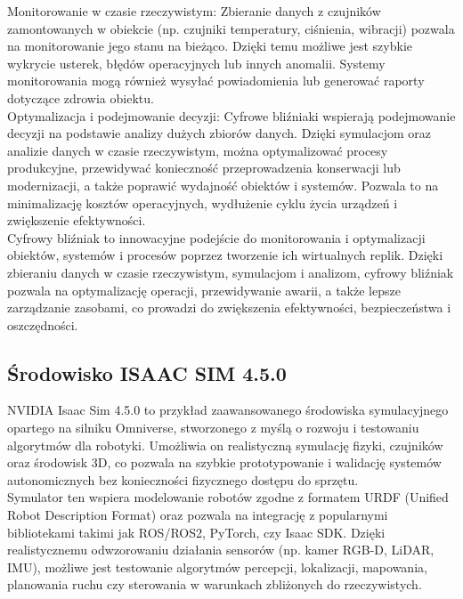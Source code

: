 \documentclass[12pt]{article}
\begin{document}
\noindent Monitorowanie w czasie rzeczywistym: Zbieranie danych z czujników zamontowanych w obiekcie (np. czujniki temperatury, ciśnienia, wibracji) pozwala na monitorowanie jego stanu na bieżąco. Dzięki temu możliwe jest szybkie wykrycie usterek, błędów operacyjnych lub innych anomalii. Systemy monitorowania mogą również wysyłać powiadomienia lub generować raporty dotyczące zdrowia obiektu.\\

\noindent Optymalizacja i podejmowanie decyzji: Cyfrowe bliźniaki wspierają podejmowanie decyzji na podstawie analizy dużych zbiorów danych. Dzięki symulacjom oraz analizie danych w czasie rzeczywistym, można optymalizować procesy produkcyjne, przewidywać konieczność przeprowadzenia konserwacji lub modernizacji, a także poprawić wydajność obiektów i systemów. Pozwala to na minimalizację kosztów operacyjnych, wydłużenie cyklu życia urządzeń i zwiększenie efektywności.\\

\noindent Cyfrowy bliźniak to innowacyjne podejście do monitorowania i optymalizacji obiektów, systemów i procesów poprzez tworzenie ich wirtualnych replik. Dzięki zbieraniu danych w czasie rzeczywistym, symulacjom i analizom, cyfrowy bliźniak pozwala na optymalizację operacji, przewidywanie awarii, a także lepsze zarządzanie zasobami, co prowadzi do zwiększenia efektywności, bezpieczeństwa i oszczędności.

\clearpage

\subsection{Środowisko ISAAC SIM 4.5.0}

NVIDIA Isaac Sim 4.5.0 to przykład zaawansowanego środowiska symulacyjnego opartego na silniku Omniverse, stworzonego z myślą o rozwoju i testowaniu algorytmów dla robotyki. Umożliwia on realistyczną symulację fizyki, czujników oraz środowisk 3D, co pozwala na szybkie prototypowanie i walidację systemów autonomicznych bez konieczności fizycznego dostępu do sprzętu.\\

\noindent Symulator ten wspiera modelowanie robotów zgodne z formatem URDF (Unified Robot Description Format) oraz pozwala na integrację z popularnymi bibliotekami takimi jak ROS/ROS2, PyTorch, czy Isaac SDK. Dzięki realistycznemu odwzorowaniu działania sensorów (np. kamer RGB-D, LiDAR, IMU), możliwe jest testowanie algorytmów percepcji, lokalizacji, mapowania, planowania ruchu czy sterowania w warunkach zbliżonych do rzeczywistych.\\
\end{document}
